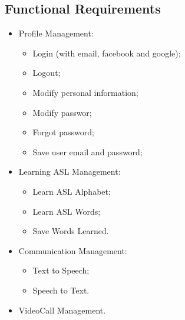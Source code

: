 \lhead{}

\subsection{Functional Requirements}
\begin{itemize}
	\item {Profile Management:
	\begin{itemize}
		\item Login (with email, facebook and google);
		\item Logout;
		\item Modify personal information;
		\item Modify passwor;
		\item Forgot password;
		\item Save user email and password;
	\end{itemize}
	}
	\item Learning ASL Management:
	\begin{itemize}
		\item Learn ASL Alphabet;
		\item Learn ASL Words;
		\item Save Words Learned.
	\end{itemize} 
	\item Communication Management:
	\begin{itemize}
		\item Text to Speech;
		\item Speech to Text.
	\end{itemize}
	\item VideoCall Management.
\end{itemize}

